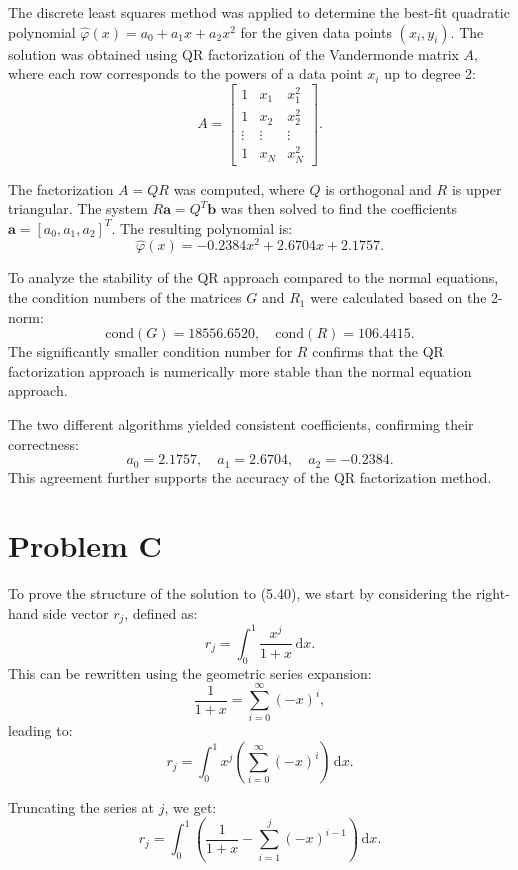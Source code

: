 \documentclass[a4paper]{article}
\begin{document}
The discrete least squares method was applied to determine the best-fit quadratic polynomial \( \hat{\varphi}(x) = a_0 + a_1 x + a_2 x^2 \) for the given data points \((x_i, y_i)\). The solution was obtained using QR factorization of the Vandermonde matrix \( A \), where each row corresponds to the powers of a data point \( x_i \) up to degree 2:
\[
A = 
\begin{bmatrix}
1 & x_1 & x_1^2 \\
1 & x_2 & x_2^2 \\
\vdots & \vdots & \vdots \\
1 & x_N & x_N^2
\end{bmatrix}.
\]

The factorization \( A = QR \) was computed, where \( Q \) is orthogonal and \( R \) is upper triangular. The system \( R \mathbf{a} = Q^T \mathbf{b} \) was then solved to find the coefficients \( \mathbf{a} = [a_0, a_1, a_2]^T \). The resulting polynomial is:
\[
\hat{\varphi}(x) = -0.2384 x^2 + 2.6704 x + 2.1757.
\]

To analyze the stability of the QR approach compared to the normal equations, the condition numbers of the matrices \( G \) and \( R_1 \) were calculated based on the 2-norm:
\[
\text{cond}(G) = 18556.6520, \quad \text{cond}(R) = 106.4415.
\]
The significantly smaller condition number for \( R \) confirms that the QR factorization approach is numerically more stable than the normal equation approach.

The two different algorithms yielded consistent coefficients, confirming their correctness:
\[
a_0 = 2.1757, \quad a_1 = 2.6704, \quad a_2 = -0.2384.
\]
This agreement further supports the accuracy of the QR factorization method.

\section*{Problem C}

To prove the structure of the solution to (5.40), we start by considering the right-hand side vector \( r_j \), defined as:
\[
r_j = \int_0^1 \frac{x^j}{1+x} \, \mathrm{d}x.
\]
This can be rewritten using the geometric series expansion:
\[
\frac{1}{1+x} = \sum_{i=0}^\infty (-x)^i,
\]
leading to:
\[
r_j = \int_0^1 x^j \left( \sum_{i=0}^\infty (-x)^i \right) \, \mathrm{d}x.
\]

Truncating the series at \( j \), we get:
\[
r_j = \int_0^1 \left( \frac{1}{1+x} - \sum_{i=1}^j (-x)^{i-1} \right) \, \mathrm{d}x.
\]
\end{document}
